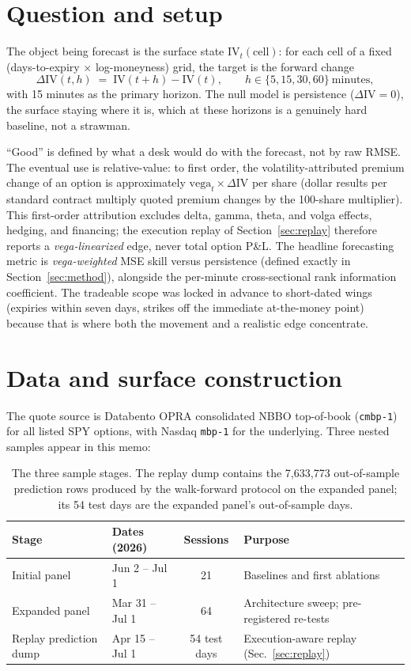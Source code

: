\documentclass[11pt]{article}
\newcommand{\dIV}{\Delta\mathrm{IV}}
\begin{document}
\section{Question and setup}
\label{sec:setup}

The object being forecast is the surface state
$\mathrm{IV}_t(\text{cell})$: for each cell of a fixed
(days-to-expiry $\times$ log-moneyness) grid, the target is the forward
change
\[
  \dIV(t, h) \;=\; \mathrm{IV}(t+h) - \mathrm{IV}(t),
  \qquad h \in \{5, 15, 30, 60\}\ \text{minutes},
\]
with 15 minutes as the primary horizon. The null model is persistence
($\dIV = 0$), the surface staying where it is, which at these horizons is
a genuinely hard baseline, not a strawman.

``Good'' is defined by what a desk would do with the forecast, not by raw
RMSE. The eventual use is relative-value: to first order, the
volatility-attributed premium change of an option is approximately
$\text{vega}_t \times \dIV$ per share (dollar results per standard contract
multiply quoted premium changes by the 100-share multiplier). This
first-order attribution excludes delta, gamma, theta, and volga effects,
hedging, and financing; the execution replay of Section~\ref{sec:replay}
therefore reports a \emph{vega-linearized} edge, never total option P\&L.
The headline forecasting metric is \emph{vega-weighted} MSE skill versus
persistence (defined exactly in Section~\ref{sec:method}), alongside the
per-minute cross-sectional rank information coefficient. The tradeable scope
was locked in advance to short-dated wings (expiries within seven days, strikes off the immediate at-the-money point) because that is where both
the movement and a realistic edge concentrate.

\section{Data and surface construction}
\label{sec:data}

The quote source is Databento OPRA consolidated NBBO top-of-book
(\texttt{cmbp-1}) for all listed SPY options, with Nasdaq \texttt{mbp-1} for
the underlying. Three nested samples appear in this memo:

\begin{table}[h]
\centering
\small
\begin{tabular}{llcl}
\toprule
Stage & Dates (2026) & Sessions & Purpose \\
\midrule
Initial panel & Jun 2 -- Jul 1 & 21 & Baselines and first ablations \\
Expanded panel & Mar 31 -- Jul 1 & 64 & Architecture sweep; pre-registered re-tests \\
Replay prediction dump & Apr 15 -- Jul 1 & 54 test days & Execution-aware replay (Sec.~\ref{sec:replay}) \\
\bottomrule
\end{tabular}
\caption{The three sample stages. The replay dump contains the 7{,}633{,}773
out-of-sample prediction rows produced by the walk-forward protocol on the
expanded panel; its 54 test days are the expanded panel's out-of-sample
days.}
\label{tab:samples}
\end{table}
\end{document}
